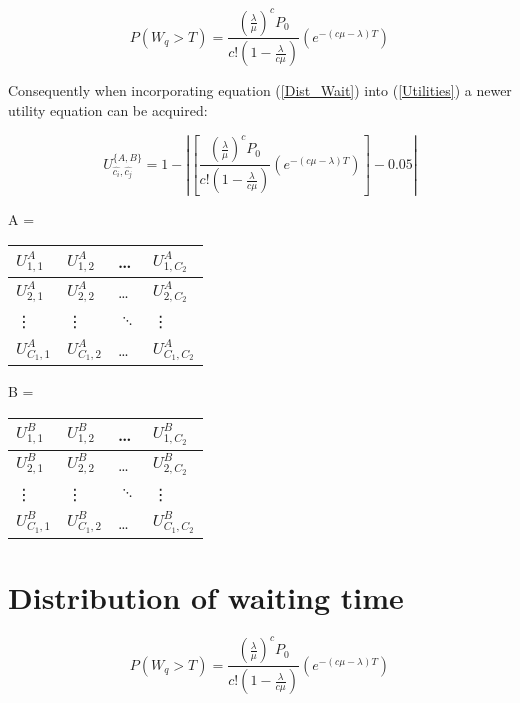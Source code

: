 \documentclass{article}
\begin{document}
\begin{equation}\label{Dist_Wait}
    P(W_q > T) = \frac{(\frac{\lambda}{\mu})^c P_0}{c!(1-\frac{\lambda}{c \mu})} (e^{-(c \mu - \lambda)T})
\end{equation}

Consequently when incorporating equation (\ref{Dist_Wait}) into (\ref{Utilities}) a newer utility equation can be acquired:
 
\begin{equation}\label{Utilities2}
    U_{\hat{c_i}, \hat{c_j}} ^ {\{A, B\}} = 1 - \left| \left[ \frac{(\frac{\lambda}{\mu})^c P_0}{c!(1-\frac{\lambda}{c \mu})} \left( e^{-(c \mu - \lambda)T} \right) \right] - 0.05 \right|
\end{equation}

\begin{table}[h]
    \centering
    \begin{minipage}{.5\linewidth}
        A = 
        \begin{tabular}{|l|l|l|l|}
            \hline
            $U_{1,1}^A$ & $U_{1,2}^A$ & \dots & $U_{1,C_2}^A$ \\ \hline
            $U_{2,1}^A$ & $U_{2,2}^A$ & \dots & $U_{2,C_2}^A$ \\ \hline
            \vdots & \vdots & $\ddots$ & \vdots \\ \hline
            $U_{C_1,1}^A$ & $U_{C_1,2}^A$ & \dots & $U_{C_1,C_2}^A$ \\ \hline
        \end{tabular}
    \end{minipage}%
    \begin{minipage}{.5\linewidth}
        B = 
        \begin{tabular}{|l|l|l|l|}
            \hline
            $U_{1,1}^B$ & $U_{1,2}^B$ & \dots & $U_{1,C_2}^B$ \\ \hline
            $U_{2,1}^B$ & $U_{2,2}^B$ & \dots & $U_{2,C_2}^B$ \\ \hline
            \vdots & \vdots & $\ddots$ & \vdots \\ \hline
            $U_{C_1,1}^B$ & $U_{C_1,2}^B$ & \dots & $U_{C_1,C_2}^B$ \\ \hline
        \end{tabular}
    \end{minipage}
\end{table}  


\section{Distribution of waiting time}
\begin{equation}
    P(W_q > T) = \frac{(\frac{\lambda}{\mu})^c P_0}{c!(1-\frac{\lambda}{c \mu})} (e^{-(c \mu - \lambda)T})
\end{equation}
\end{document}
